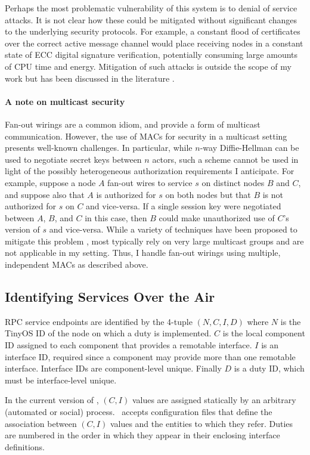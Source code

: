 Perhaps the most problematic vulnerability of this system is to denial of service attacks. It is
not clear how these could be mitigated without significant changes to the underlying security
protocols. For example, a constant flood of certificates over the correct active message channel
would place receiving nodes in a constant state of ECC digital signature verification,
potentially consuming large amounts of CPU time and energy. Mitigation of such attacks is
outside the scope of my work but has been discussed in the literature \cite{4431860}.

\paragraph{A note on multicast security} Fan-out wirings are a common idiom, and provide a form
of multicast communication. However, the use of MACs for security in a multicast setting
presents well-known challenges. In particular, while $n$-way Diffie-Hellman can be used to
negotiate secret keys between $n$ actors, such a scheme cannot be used in light of the possibly
heterogeneous authorization requirements I anticipate. For example, suppose a node $A$ fan-out
wires to service $s$ on distinct nodes $B$ and $C$, and suppose also that $A$ is authorized for
$s$ on both nodes but that $B$ is not authorized for $s$ on $C$ and vice-versa. If a single
session key were negotiated between $A$, $B$, and $C$ in this case, then $B$ could make
unauthorized use of $C$'s version of $s$ and vice-versa. While a variety of techniques have been
proposed to mitigate this problem \cite{canetti-1999}, most typically rely on very large
multicast groups and are not applicable in my setting. Thus, I handle fan-out wirings using
multiple, independent MACs as described above.

\subsection{Identifying Services Over the Air}

RPC service endpoints are identified by the 4-tuple $(N, C, I, D)$ where $N$ is the TinyOS ID of
the node on which a duty is implemented. $C$ is the local component ID assigned to each
component that provides a remotable interface. $I$ is an interface ID, required since a
component may provide more than one remotable interface. Interface IDs are component-level
unique. Finally $D$ is a duty ID, which must be interface-level unique.

In the current version of \Sprocket, $(C, I)$ values are assigned statically by an arbitrary
(automated or social) process. \Sprocket\ accepts configuration files that define the
association between $(C, I)$ values and the entities to which they refer. Duties are numbered in
the order in which they appear in their enclosing interface definitions.

